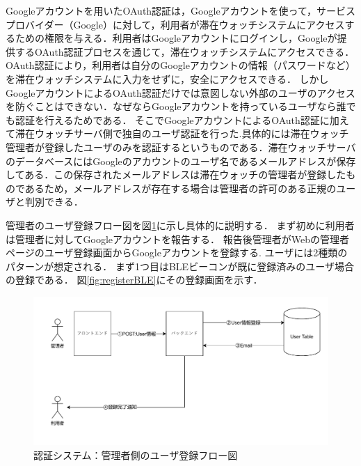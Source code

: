 Googleアカウントを用いたOAuth認証は，Googleアカウントを使って，サービスプロバイダー（Google）に対して，利用者が滞在ウォッチシステムにアクセスするための権限を与える．利用者はGoogleアカウントにログインし，Googleが提供するOAuth認証プロセスを通じて，滞在ウォッチシステムにアクセスできる．
OAuth認証により，利用者は自分のGoogleアカウントの情報（パスワードなど）を滞在ウォッチシステムに入力をせずに，安全にアクセスできる．
しかしGoogleアカウントによるOAuth認証だけでは意図しない外部のユーザのアクセスを防ぐことはできない．なぜならGoogleアカウントを持っているユーザなら誰でも認証を行えるためである．
そこでGoogleアカウントによるOAuth認証に加えて滞在ウォッチサーバ側で独自のユーザ認証を行った.具体的には滞在ウォッチ管理者が登録したユーザのみを認証するというものである．滞在ウォッチサーバのデータベースにはGoogleのアカウントのユーザ名であるメールアドレスが保存してある．この保存されたメールアドレスは滞在ウォッチの管理者が登録したものであるため，メールアドレスが存在する場合は管理者の許可のある正規のユーザと判別できる．



管理者のユーザ登録フロー図を図\ref{fig:registerUser}に示し具体的に説明する．
まず初めに利用者は管理者に対してGoogleアカウントを報告する．
報告後管理者がWebの管理者ページのユーザ登録画面からGoogleアカウントを登録する.
ユーザには2種類のパターンが想定される．
まず1つ目はBLEビーコンが既に登録済みのユーザ場合の登録である．
図\ref{fig:registerBLE}にその登録画面を示す．

\begin{figure}[h]
  \centering  %
  \includegraphics[clip,scale = 0.7]{image/regsiterUser.pdf}
  \caption{認証システム：管理者側のユーザ登録フロー図}    \label{fig:registerUser}
\end{figure}




